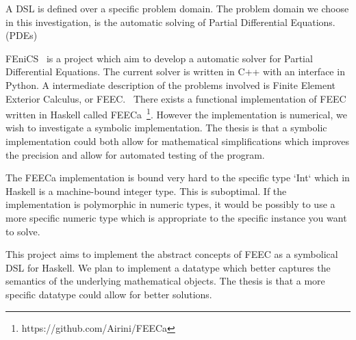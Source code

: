 \documentclass{scrartcl}
\begin{document}
A DSL is defined over a specific problem domain. The problem domain we choose
in this investigation, is the automatic solving of Partial Differential
Equations. (PDEs)

FEniCS~\cite{AlnaesBlechta2015a} is a project which aim to develop a automatic
solver for Partial Differential Equations. The current solver is written in C++
with an interface in Python. A intermediate description of the problems
involved is Finite Element Exterior Calculus, or FEEC.~\cite{arnold2006finite}
There exists a functional implementation of FEEC written in Haskell called
FEECa~\footnote{https://github.com/Airini/FEECa}.  However the implementation
is numerical, we wish to investigate a symbolic implementation.  The thesis is
that a symbolic implementation could both allow for mathematical
simplifications which improves the precision and allow for automated testing of
the program.


The FEECa implementation is bound very hard to the specific type `Int` which in
Haskell is a machine-bound integer type. This is suboptimal. If the
implementation is polymorphic in numeric types, it would be possibly to use
a more specific numeric type which is appropriate to the specific instance you
want to solve.


This project aims to implement the abstract concepts of FEEC as a symbolical
DSL for Haskell.  %
We plan to implement a datatype which better captures the semantics of the
underlying mathematical objects.  The thesis is that a more specific datatype
could allow for better solutions.


\end{document}
